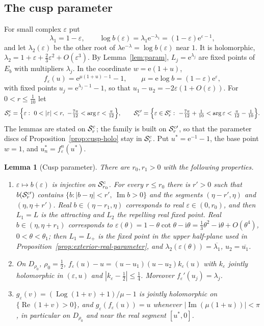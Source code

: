 \documentclass[11pt]{amsart}
\newtheorem{lemma}[theorem]{Lemma}
\theoremstyle{definition}
\newcommand{\eee}{\mathrm{e}}
\newcommand{\ii}{\mathrm{i}}
\begin{document}
\subsection{The cusp parameter}
For small complex $\varepsilon$ put
\[
 \lambda_1=1-\varepsilon,\qquad
 \log b(\varepsilon)=\lambda_1\eee^{-\lambda_1}=(1-\varepsilon)\eee^{\varepsilon-1},
\]
and let $\lambda_2(\varepsilon)$ be the other root of
$\lambda\eee^{-\lambda}=\log b(\varepsilon)$ near $1$.  It is holomorphic,
$\lambda_2=1+\varepsilon+\tfrac23\varepsilon^2+O(\varepsilon^3)$.  By
Lemma~\ref{lem:param}, $L_j=\eee^{\lambda_j}$ are fixed points of
$E_b$ with multipliers $\lambda_j$.  In the coordinate $w=\eee(1+u)$,
\[
 f_\varepsilon(u)=\eee^{\mu(1+u)-1}-1,\qquad \mu=\eee\log b=(1-\varepsilon)\eee^{\varepsilon},
\]
with fixed points $u_j=\eee^{\lambda_j-1}-1$, so that
$u_1-u_2=-2\varepsilon(1+O(\varepsilon))$.  For $0<r\le\tfrac1{10}$ let
\[
 \mathcal S^{\rm c}_r=\Bigl\{\varepsilon:\ 0<|\varepsilon|<r,\
   -\tfrac{7\pi}{12}<\arg\varepsilon<\tfrac\pi{12}\Bigr\},\qquad
 \mathcal S^{\rm c\prime}_r=\Bigl\{\varepsilon\in\mathcal S^{\rm c}_r:\
   -\tfrac{7\pi}{12}+\tfrac1{10}<\arg\varepsilon<\tfrac\pi{12}-\tfrac1{10}\Bigr\}.
\]
The lemmas are stated on $\mathcal S^{\rm c}_r$; the family is built on
$\mathcal S^{\rm c\prime}_r$, so that the parameter discs of
Proposition~\ref{prop:cusp-holo} stay in $\mathcal S^{\rm c}_r$.  Put
$u^*=\eee^{-1}-1$, the base point $w=1$, and $u^*_n=f_\varepsilon^n(u^*)$.

\begin{lemma}[Cusp parameter]\label{lem:cusp-param}
There are $r_0,r_1>0$ with the following properties.
\begin{enumerate}
\item $\varepsilon\mapsto b(\varepsilon)$ is injective on $\mathcal S^{\rm c}_{r_0}$.  For every
  $r\le r_0$ there is $r'>0$ such that $b(\mathcal S^{\rm c\prime}_r)$ contains
  $\{b:|b-\eta|<r',\ \operatorname{Im}b>0\}$ and the segments $(\eta-r',\eta)$ and
  $(\eta,\eta+r')$.  Real $b\in(\eta-r_1,\eta)$ corresponds to real
  $\varepsilon\in(0,r_0)$, and then $L_1=L$ is the attracting and $L_2$ the repelling
  real fixed point.  Real $b\in(\eta,\eta+r_1)$ corresponds to
  $\varepsilon(\theta)=1-\theta\cot\theta-\ii\theta=\tfrac13\theta^2-\ii\theta+O(\theta^4)$,
  $0<\theta<\theta_1$; then $L_1=L_+$ is the fixed point in the upper
  half-plane used in Proposition~\ref{prop:exterior-real-parameter}, and
  $\lambda_2(\varepsilon(\theta))=\overline{\lambda_1}$, $u_2=\overline{u_1}$.
\item On $D_{\rho_0}$, $\rho_0=\tfrac12$,
  $f_\varepsilon(u)-u=(u-u_1)(u-u_2)k_\varepsilon(u)$ with $k_\varepsilon$ jointly holomorphic in
  $(\varepsilon,u)$ and $|k_\varepsilon-\tfrac12|\le\tfrac14$.  Moreover $f_\varepsilon'(u_j)=\lambda_j$.
\item $g_\varepsilon(v)=(\operatorname{Log}(1+v)+1)/\mu-1$ is jointly holomorphic on
  $\{\operatorname{Re}(1+v)>0\}$, and $g_\varepsilon(f_\varepsilon(u))=u$ whenever
  $|\operatorname{Im}(\mu(1+u))|<\pi$, in particular on $D_{\rho_0}$ and near the real
  segment $[u^*,0]$.
\end{enumerate}
\end{lemma}
\end{document}
